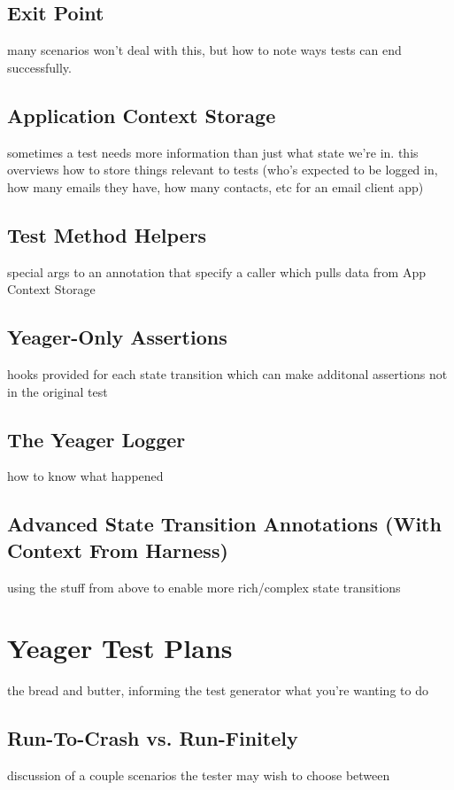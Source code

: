 \subsection{Exit Point}
many scenarios won't deal with this, but how to note ways tests can end successfully.

\subsection{Application Context Storage}
sometimes a test needs more information than just what state we're in. this overviews how to store things relevant to tests (who's expected to be logged in, how many emails they have, how many contacts, etc for an email client app)

\subsection{Test Method Helpers}
special args to an annotation that specify a caller which pulls data from App Context Storage

\subsection{Yeager-Only Assertions}
hooks provided for each state transition which can make additonal assertions not in the original test

\subsection{The Yeager Logger}
how to know what happened

\subsection{Advanced State Transition Annotations (With Context From Harness)}
using the stuff from above to enable more rich/complex state transitions

\section{Yeager Test Plans}
the bread and butter, informing the test generator what you're wanting to do

\subsection{Run-To-Crash vs. Run-Finitely}
discussion of a couple scenarios the tester may wish to choose between

